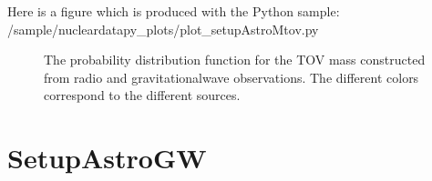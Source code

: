 \documentclass[letterpaper,10pt,english]{sphinxmanual}
\begin{document}
\sphinxAtStartPar
Here is a figure which is produced with the Python sample: /sample/nucleardatapy\_plots/plot\_setupAstroMtov.py

\begin{figure}[htbp]
\centering
\capstart

\noindent{}
\caption{The probability distribution function for the TOV mass constructed from radio and gravitational\sphinxhyphen{}wave observations.
The different colors correspond to the different sources.}\label{\detokenize{source/api/setup_astro_mtov:id1}}\end{figure}

\sphinxstepscope


\section{SetupAstroGW}
\label{\detokenize{source/api/setup_astro_gw:setupastrogw}}\label{\detokenize{source/api/setup_astro_gw::doc}}\label{\detokenize{source/api/setup_astro_gw:module-nucleardatapy.setup_astro_gw}}
\end{document}
